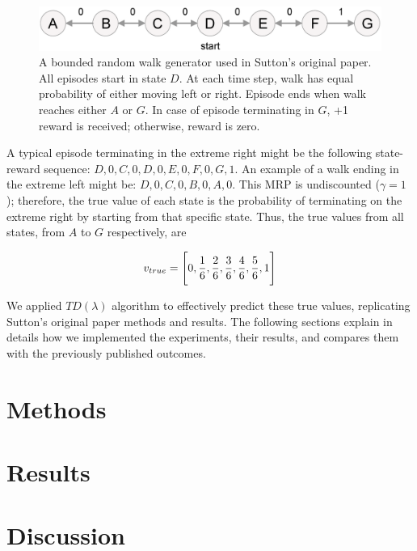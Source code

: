 \documentclass{article}
\begin{document}
\begin{figure}[t]
    \includegraphics[scale=0.3]{random_walk.eps}
    \centering
    \caption{A bounded random walk generator used in Sutton's original paper.
    All episodes start in state $D$.
    At each time step, walk has equal probability of either moving left or right.
    Episode ends when walk reaches either $A$ or $G$.
    In case of episode terminating in $G$, +1 reward is received;
    otherwise, reward is zero.}
\end{figure}

A typical episode terminating in the extreme right might be the following state-reward sequence: $D, 0, C, 0, D, 0, E, 0, F, 0, G, 1$.
An example of a walk ending in the extreme left might be: $D, 0, C, 0, B, 0, A, 0$.
This MRP is undiscounted ($\gamma = 1$);
therefore, the true value of each state is the probability of terminating on the extreme right by starting from that specific state.
Thus, the true values from all states, from $A$ to $G$ respectively, are

\begin{equation}
    v_{true} = \Bigg[0, \frac{1}{6}, \frac{2}{6}, \frac{3}{6}, \frac{4}{6}, \frac{5}{6}, 1\Bigg]
    \centering
\end{equation}

We applied $TD(\lambda)$ algorithm to effectively predict these true values, replicating Sutton's original paper methods and results.
The following sections explain in details how we implemented the experiments, their results, and compares them with the previously published outcomes.

\section{Methods}
\label{sec:methods}
\lipsum[2]
\lipsum[3]

\section{Results}
\label{sec:results}
\lipsum[2]
\lipsum[3]

\section{Discussion}
\label{sec:discussion}
\lipsum[2]
\lipsum[3]
\end{document}
